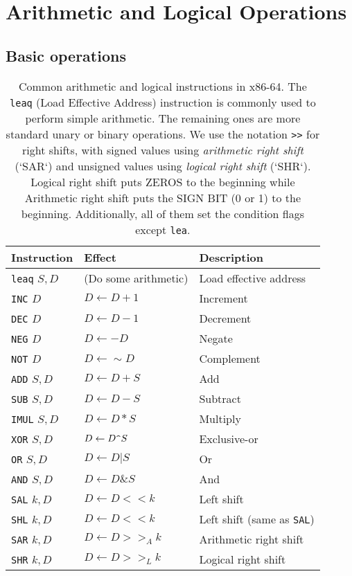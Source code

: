 \section{Arithmetic and Logical Operations}
\subsection{Basic operations}
\begin{table}[h]
    \centering
    \small
    \renewcommand{\arraystretch}{1.2}
    \begin{tabular}{l l l}
        \toprule
        \textbf{Instruction} & \textbf{Effect} & \textbf{Description} \\
        \midrule
        \texttt{leaq} $S, D$  &  (Do some arithmetic)  & Load effective address \\
        \midrule
        \texttt{INC} $D$  & $D \leftarrow D+1$ & Increment \\
        \texttt{DEC} $D$  & $D \leftarrow D-1$ & Decrement \\
        \texttt{NEG} $D$  & $D \leftarrow -D$ & Negate \\
        \texttt{NOT} $D$  & $D \leftarrow \sim D$ & Complement \\
        \midrule
        \texttt{ADD} $S, D$  & $D \leftarrow D + S$ & Add \\
        \texttt{SUB} $S, D$  & $D \leftarrow D - S$ & Subtract \\
        \texttt{IMUL} $S, D$  & $D \leftarrow D * S$ & Multiply \\
        \texttt{XOR} $S, D$  & $D \leftarrow D  \texttt{\string^} S$ & Exclusive-or \\
        \texttt{OR} $S, D$  & $D \leftarrow D | S$ & Or \\
        \texttt{AND} $S, D$  & $D \leftarrow D \& S$ & And \\
        \midrule
        \texttt{SAL} $k, D$  & $D \leftarrow D << k$ & Left shift \\
        \texttt{SHL} $k, D$  & $D \leftarrow D << k$ & Left shift (same as \texttt{SAL}) \\
        \texttt{SAR} $k, D$  & $D \leftarrow D >>_A k$ & Arithmetic right shift \\
        \texttt{SHR} $k, D$  & $D \leftarrow D >>_L k$ & Logical right shift \\
        \bottomrule
    \end{tabular}
    \caption{Common arithmetic and logical instructions in x86-64. The \texttt{leaq} 
    (Load Effective Address) instruction is commonly used to perform simple arithmetic. 
    The remaining ones are more standard unary or binary operations. We use the notation 
    \texttt{>>} for right shifts, with signed values using \textit{arithmetic right shift} 
    (`SAR`) and unsigned values using \textit{logical right shift} (`SHR`). Logical right 
    shift puts ZEROS to the beginning while Arithmetic right shift puts the SIGN BIT (0 or 1)
     to the beginning. Additionally, all of them set the condition flags except \texttt{lea}.}
    \label{basic-arith}
\end{table}


